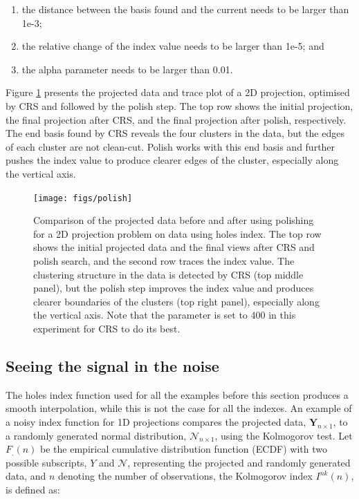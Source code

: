 \begin{enumerate}
\def\labelenumi{\arabic{enumi})}
\tightlist
\item
  the distance between the basis found and the current needs to be larger than 1e-3;
\item
  the relative change of the index value needs to be larger than 1e-5; and
\item
  the alpha parameter needs to be larger than 0.01.
\end{enumerate}

Figure \ref{fig:polish} presents the projected data and trace plot of a 2D projection, optimised by CRS and followed by the polish step. The top row shows the initial projection, the final projection after CRS, and the final projection after polish, respectively. The end basis found by CRS reveals the four clusters in the data, but the edges of each cluster are not clean-cut. Polish works with this end basis and further pushes the index value to produce clearer edges of the cluster, especially along the vertical axis.

\begin{figure}

{\centering \texttt{[image: figs/polish]} 

}

\caption{Comparison of the projected data before and after using polishing for a 2D projection problem on  data using holes index. The top row shows the initial projected data and the final views after CRS and polish search, and the second row traces the index value. The clustering structure in the data is detected by CRS (top middle panel), but the polish step improves the index value and produces clearer boundaries of the clusters (top right panel), especially along the vertical axis. Note that the parameter  is set to 400 in this experiment for CRS to do its best.}\label{fig:polish}
\end{figure}

\hypertarget{seeing-the-signal-in-the-noise}{%
\subsection{Seeing the signal in the noise}\label{seeing-the-signal-in-the-noise}}

The holes index function used for all the examples before this section produces a smooth interpolation, while this is not the case for all the indexes. An example of a noisy index function for 1D projections compares the projected data, \(\mathbf{Y}_{n \times 1}\), to a randomly generated normal distribution, \(\mathcal{N}_{n \times 1}\), using the Kolmogorov test. Let \(F_{.}(n)\) be the empirical cumulative distribution function (ECDF) with two possible subscripts, \(Y\) and \(\mathcal{N}\), representing the projected and randomly generated data, and \(n\) denoting the number of observations, the Kolmogorov index \(I^{nk}(n)\), is defined as:

